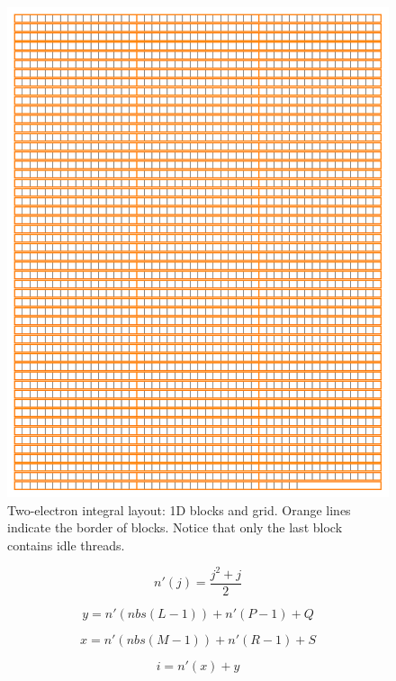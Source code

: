 \begin{figure}[h!]
\includegraphics[width=1\textwidth]{Figures/gen_vec_block_layout.png}
\caption[Two-electron integral layout: 1D blocks and grid]
{Two-electron integral layout: 1D blocks and grid. Orange lines indicate the border of blocks. Notice that only the last block contains idle threads.}
\label{fig:genvecblock}
\end{figure}

\begin{equation}
\label{nprime}
n'(j) = \frac{j^{2}+j}{2}
\end{equation}

\begin{equation}
\label{ylpq}
y = n'(nbs(L - 1)) + n'(P - 1) + Q
\end{equation}

\begin{equation}
\label{xmrs}
x = n'(nbs(M - 1)) + n'(R - 1) + S
\end{equation}

\begin{equation}
\label{numtothread}
i = n'(x) + y
\end{equation}

